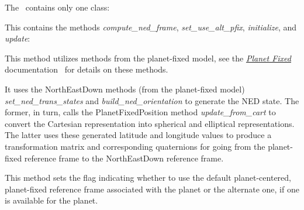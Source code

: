 The \NEDDesc\ contains only one class:
\begin{itemize}

This contains the methods \textit{compute\_ned\_frame}, \textit{set\_use\_alt\_pfix}, \textit{initialize}, and \textit{update}:
\begin{enumerate}

This method utilizes methods from the planet-fixed model, see the \href{file:\JEODHOME/models/utils/planet\_fixed/docs/planet\_fixed.pdf}{\em Planet Fixed} documentation~\cite{dynenv:PLANETFIXED} for details on these methods.

It uses the NorthEastDown methods (from the planet-fixed model) \textit{set\_ned\_trans\_states} and \textit{build\_ned\_orientation} to generate the NED state.  The former, in turn, calls the PlanetFixedPosition method \textit{update\_from\_cart} to convert the Cartesian representation into spherical and elliptical representations.  The latter uses these generated latitude and longitude values to  produce a transformation matrix and corresponding quaternions for going from the planet-fixed reference frame to the NorthEastDown reference frame.

This method sets the flag indicating whether to use the default planet-centered, planet-fixed reference frame associated with the planet or the alternate one, if one is available for the planet.


\end{enumerate}
\end{itemize}
